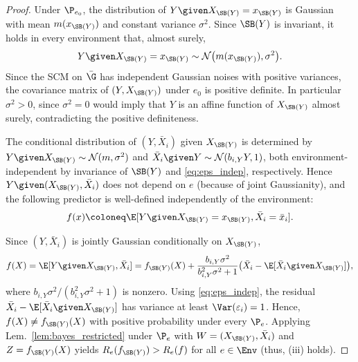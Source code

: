 \begin{proof}
Under $\P_{e_0}$, the distribution of
$Y\given X_{\SB(Y)} = x_{\SB(Y)}$ is Gaussian with mean $m(x_{\SB(Y)})$ and
constant variance $\sigma^2$.  Since $\SB(Y)$ is invariant, it holds in every environment that, almost surely,
$$ Y\given X_{\SB(Y)}=x_{\SB(Y)} 
\sim \mathcal{N}\bigl(m(x_{\SB(Y)}), \sigma^2\bigr). $$
Since the SCM on $\bar{\G}$ has independent Gaussian noises with positive variances, the
covariance matrix of $(Y,X_{\SB(Y)})$ under $e_0$ is positive definite. In particular $\sigma^2>0$, since $\sigma^2=0$ would imply that $Y$ is an affine
function of $X_{\SB(Y)}$ almost surely, contradicting the positive definiteness.

The conditional distribution of $(Y, \bar{X}_i)$ given $X_{\SB(Y)}$ is
determined by 
$Y\given X_{\SB(Y)}\sim\mathcal{N}(m,\sigma^2)$ and
$\bar{X}_i\given Y\sim\mathcal{N}(b_{i,Y}Y,1)$, both
environment-independent by invariance of $\SB(Y)$ and \eqref{eq:eps_indep}, respectively. 
Hence $Y\given(X_{\SB(Y)}, \bar{X}_i)$ does not depend on $e$ (because of joint Gaussianity), and the following
predictor is well-defined independently of the environment:
$$f(x)\coloneq\E[Y\given X_{\SB(Y)}=x_{\SB(Y)}, \bar{X}_i=\bar{x}_i].$$

Since $(Y, \bar{X}_i)$ is jointly Gaussian conditionally on $X_{\SB(Y)}$,
\[
f(X)
= \E[Y\given X_{\SB(Y)},\bar{X}_i]
= f_{\SB(Y)}(X)
  + \frac{b_{i,Y} \sigma^2}{b_{i,Y}^2 \sigma^2+1}
    \bigl(\bar{X}_i-\E[\bar{X}_i\given X_{\SB(Y)}]\bigr),
\]
where $b_{i,Y} \sigma^2 /(b_{i,Y}^2 \sigma^2+1)$ is nonzero. Using \eqref{eq:eps_indep}, the residual $\bar{X}_i - \E[\bar{X}_i \given X_{\SB(Y)}]$ has variance at least $\Var(\varepsilon_i) = 1$. Hence, $f(X) \neq f_{\SB(Y)}(X)$ with positive probability under
every $\P_e$. Applying Lem.~\ref{lem:bayes_restricted} under $\P_e$ with
$W=(X_{\SB(Y)}, \bar{X}_i)$ and $Z=f_{\SB(Y)}(X)$ yields
$R_e(f_{\SB(Y)})>R_e(f)$ for all $e\in\Env$ (thus, (iii) holds).
\end{proof}

